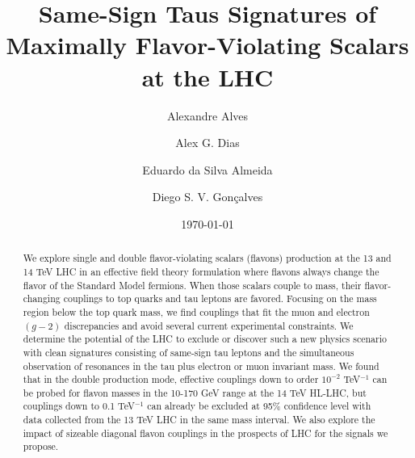 \documentclass[prd,amsfonts,onecolumn,superscriptaddress,aps,nofootinbib,11pt]{revtex4-1}
\begin{document}
	
\title{ %
Same-Sign Taus Signatures of Maximally Flavor-Violating Scalars at the LHC }

\author{Alexandre Alves}
\author{Alex G. Dias}
\author{Eduardo da Silva Almeida}
\author{Diego S. V. Gon\c{c}alves}

\date{\today}
	
\begin{abstract}
We explore single and double flavor-violating scalars (flavons) production at the 13 and 14 TeV LHC in an effective field theory formulation where flavons always change the flavor of the Standard Model fermions. When those scalars couple to mass, their flavor-changing couplings to top quarks and tau leptons are favored. Focusing on the mass region below the top quark mass, we find couplings that fit the muon and electron $(g-2)$ discrepancies and avoid several current experimental constraints. We determine the potential of the LHC to exclude or discover such a new physics scenario with clean signatures consisting of same-sign tau leptons and the simultaneous observation of resonances in the tau plus electron or muon invariant mass. We found that in the double production mode, effective couplings down to order $10^{-2}$ TeV$^{-1}$ can be probed for flavon masses in the 10-170 GeV range at the 14 TeV HL-LHC, but couplings down to 0.1 TeV$^{-1}$ can already be excluded at 95\% confidence level with data collected from the 13 TeV LHC in the same mass interval. We also explore the impact of sizeable diagonal flavon couplings in the prospects of LHC for the signals we propose.
\end{abstract}
\end{document}
